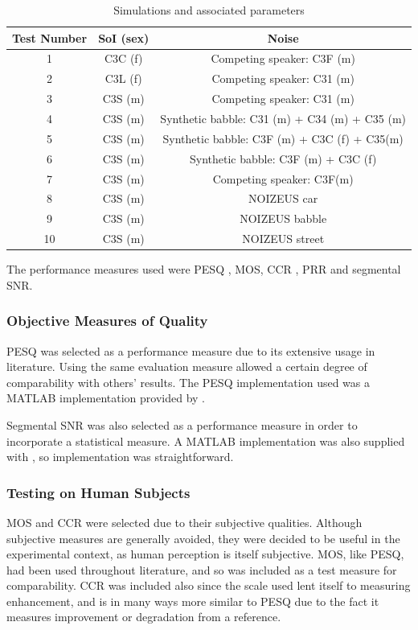 \begin{table}
\protect\caption{\label{tab:test-params}Simulations and associated parameters}


\centering{}%
\begin{tabular}{|c|c|c|}
\hline 
Test Number & \ac{SoI} (sex) & Noise\tabularnewline
\hline 
\hline 
1 & C3C (f) & Competing speaker: C3F (m)\tabularnewline
\hline 
2 & C3L (f) & Competing speaker: C31 (m)\tabularnewline
\hline 
3 & C3S (m) & Competing speaker: C31 (m)\tabularnewline
\hline 
4 & C3S (m) & Synthetic babble: C31 (m) + C34 (m) + C35 (m)\tabularnewline
\hline 
5 & C3S (m) & Synthetic babble: C3F (m) + C3C (f) + C35(m)\tabularnewline
\hline 
6 & C3S (m) & Synthetic babble: C3F (m) + C3C (f)\tabularnewline
\hline 
7 & C3S (m) & Competing speaker: C3F(m)\tabularnewline
\hline 
8 & C3S (m) & NOIZEUS car\tabularnewline
\hline 
9 & C3S (m) & NOIZEUS babble\tabularnewline
\hline 
10 & C3S (m) & NOIZEUS street\tabularnewline
\hline 
\end{tabular}
\end{table}


The performance measures used were \ac{PESQ} \citep{InternationalTelecommunicationUnion2001},
\ac{MOS}, \ac{CCR} \citep{InternationalTelecommunicationUnion1996},
\ac{PRR} and segmental \ac{SNR}.


\subsubsection*{Objective Measures of Quality}

\ac{PESQ} was selected as a performance measure due to its extensive
usage in literature. Using the same evaluation measure allowed a certain
degree of comparability with others' results. The \ac{PESQ} implementation
used was a MATLAB implementation provided by \citet{Loizou2008}.

Segmental \ac{SNR} was also selected as a performance measure in
order to incorporate a statistical measure. A MATLAB implementation
was also supplied with \citep{Loizou2008}, so implementation was
straightforward.


\subsubsection*{Testing on Human Subjects}

\ac{MOS} and \ac{CCR} were selected due to their subjective qualities.
Although subjective measures are generally avoided, they were decided
to be useful in the experimental context, as human perception is itself
subjective. \ac{MOS}, like \ac{PESQ}, had been used throughout literature,
and so was included as a test measure for comparability. \ac{CCR}
was included also since the scale used lent itself to measuring enhancement,
and is in many ways more similar to \ac{PESQ} due to the fact it
measures improvement or degradation from a reference.

